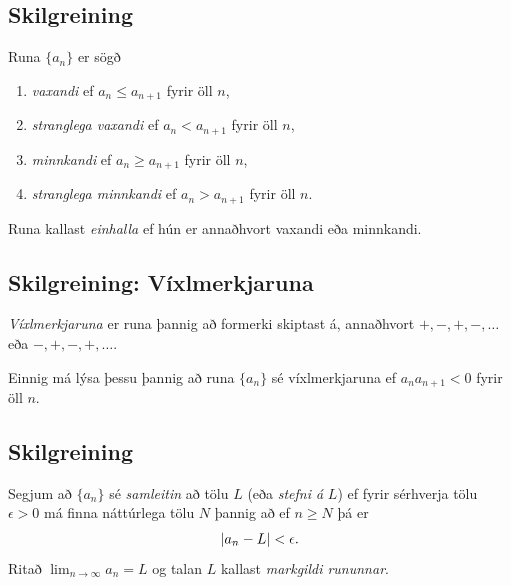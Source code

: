 \documentclass[a4paper,10pt,icelandic]{sphinxmanual}
\begin{document}
\subsection{Skilgreining}
\label{kafli09:id1}\label{kafli09:index-2}
Runa \(\{a_n\}\) er sögð
\begin{enumerate}
\item {} 
\emph{vaxandi} ef \(a_n\leq a_{n+1}\) fyrir öll \(n\),

\item {} 
\emph{stranglega vaxandi} ef \(a_n< a_{n+1}\) fyrir öll \(n\),

\item {} 
\emph{minnkandi} ef \(a_n\geq a_{n+1}\) fyrir öll \(n\),

\item {} 
\emph{stranglega minnkandi} ef \(a_n> a_{n+1}\) fyrir öll
\(n\).

\end{enumerate}

Runa kallast \emph{einhalla} ef hún er annaðhvort vaxandi eða minnkandi.


\subsection{Skilgreining: Víxlmerkjaruna}
\label{kafli09:skilgreining-vixlmerkjaruna}\label{kafli09:index-3}
\emph{Víxlmerkjaruna} er runa þannig að formerki skiptast á, annaðhvort
\(+, -, +, -, \ldots\) eða \(-, +, -, +, \ldots\).

Einnig má lýsa þessu þannig að runa \(\{a_n\}\) sé víxlmerkjaruna ef
\(a_na_{n+1}<0\) fyrir öll \(n\).


\subsection{Skilgreining}
\label{kafli09:id2}\label{kafli09:index-4}
Segjum að \(\{a_n\}\) sé \emph{samleitin} að tölu \(L\) (eða \emph{stefni
á} \(L\)) ef fyrir sérhverja tölu \(\epsilon>0\) má finna
náttúrlega tölu \(N\) þannig að ef \(n\geq N\) þá er
\begin{gather}
\begin{split}|a_n-L|<\epsilon.\end{split}\notag
\end{gather}
Ritað \(\lim_{n\rightarrow \infty}a_n=L\) og talan \(L\) kallast
\emph{markgildi rununnar}.
\end{document}
